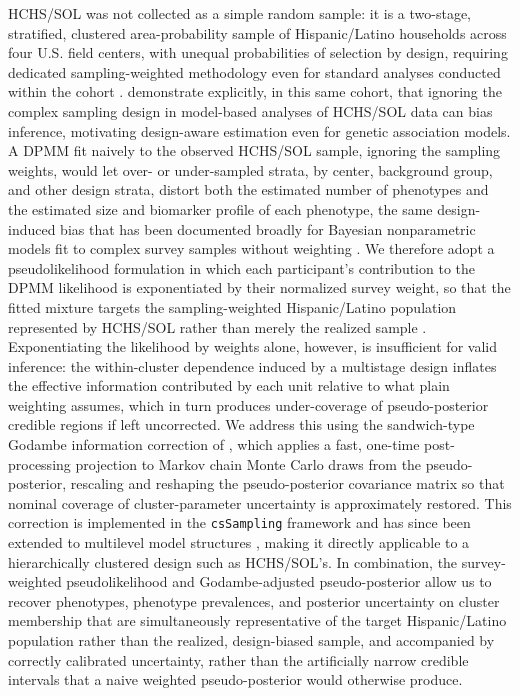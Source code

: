 \documentclass[11pt]{article}
\begin{document}
HCHS/SOL was not collected as a simple random sample: it is a two-stage, stratified, clustered area-probability sample of Hispanic/Latino households across four U.S. field centers, with unequal probabilities of selection by design, requiring dedicated sampling-weighted methodology even for standard analyses conducted within the cohort \citep{sorlie2010design,lavange2010sample}. \citet{lin2014genetic} demonstrate explicitly, in this same cohort, that ignoring the complex sampling design in model-based analyses of HCHS/SOL data can bias inference, motivating design-aware estimation even for genetic association models. A DPMM fit naively to the observed HCHS/SOL sample, ignoring the sampling weights, would let over- or under-sampled strata, by center, background group, and other design strata, distort both the estimated number of phenotypes and the estimated size and biomarker profile of each phenotype, the same design-induced bias that has been documented broadly for Bayesian nonparametric models fit to complex survey samples without weighting \citep{si2013bayesian,kunihama2014nonparametric}. We therefore adopt a pseudolikelihood formulation in which each participant's contribution to the DPMM likelihood is exponentiated by their normalized survey weight, so that the fitted mixture targets the sampling-weighted Hispanic/Latino population represented by HCHS/SOL rather than merely the realized sample \citep{savitskytoth2015bayesian,williamssavitsky2018unattenuated}. Exponentiating the likelihood by weights alone, however, is insufficient for valid inference: the within-cluster dependence induced by a multistage design inflates the effective information contributed by each unit relative to what plain weighting assumes, which in turn produces under-coverage of pseudo-posterior credible regions if left uncorrected. We address this using the sandwich-type Godambe information correction of \citet{williamssavitsky2021uncertainty}, which applies a fast, one-time post-processing projection to Markov chain Monte Carlo draws from the pseudo-posterior, rescaling and reshaping the pseudo-posterior covariance matrix so that nominal coverage of cluster-parameter uncertainty is approximately restored. This correction is implemented in the \texttt{csSampling} framework \citep{hornby2023cssampling} and has since been extended to multilevel model structures \citep{williamsmcguiresavitsky2025uncertainty}, making it directly applicable to a hierarchically clustered design such as HCHS/SOL's. In combination, the survey-weighted pseudolikelihood and Godambe-adjusted pseudo-posterior allow us to recover phenotypes, phenotype prevalences, and posterior uncertainty on cluster membership that are simultaneously representative of the target Hispanic/Latino population rather than the realized, design-biased sample, and accompanied by correctly calibrated uncertainty, rather than the artificially narrow credible intervals that a naive weighted pseudo-posterior would otherwise produce.
\end{document}
